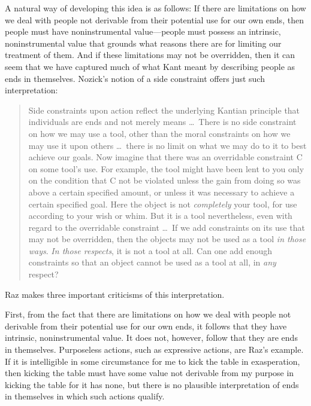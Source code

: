 \documentclass[12pt]{article}
\begin{document}
A natural way of developing this idea is as follows: If there are limitations on how we deal with people not derivable from their potential use for our own ends, then people must have noninstrumental value---people must possess an intrinsic, noninstrumental value that grounds what reasons there are for limiting our treatment of them. And if these limitations may not be overridden, then it can seem that we have captured much of what Kant meant by describing people as ends in themselves. Nozick's notion of a side constraint offers just such interpretation:
\begin{quote}
    Side constraints upon action reflect the underlying Kantian principle that individuals are ends and not merely means \ldots\ There is no side constraint on how we may use a tool, other than the moral constraints on how we may use it upon others \ldots\ there is no limit on what we may do to it to best achieve our goals. Now imagine that there was an overridable constraint C on some tool's use. For example, the tool might have been lent to you only on the condition that C not be violated unless the gain from doing so was above a certain specified amount, or unless it was necessary to achieve a certain specified goal. Here the object is not \emph{completely} your tool, for use according to your wish or whim. But it is a tool nevertheless, even with regard to the overridable constraint \ldots\ If we add constraints on its use that may not be overridden, then the objects may not be used as a tool \emph{in those ways}. \emph{In those respects}, it is not a tool at all. Can one add enough constraints so that an object cannot be used as a tool at all, in \emph{any} respect? \citep[30--1]{Nozick:1974as}
\end{quote}

Raz makes three important criticisms of this interpretation.

First, from the fact that there are limitations on how we deal with people not derivable from their potential use for our own ends, it follows that they have intrinsic, noninstrumental value. It does not, however, follow that they are ends in themselves. Purposeless actions, such as expressive actions, are Raz's example. If it is intelligible in some circumstance for me to kick the table in exasperation, then kicking the table must have some value not derivable from my purpose in kicking the table for it has none, but there is no plausible interpretation of ends in themselves in which such actions qualify.
\end{document}
